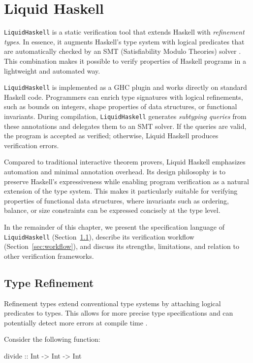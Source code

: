 \chapter { Liquid Haskell }
\texttt{LiquidHaskell} is a static verification tool that extends Haskell with
\emph{refinement types}. In essence, it augments Haskell’s type system with
logical predicates that are automatically checked by an SMT (Satisfiability
Modulo Theories) solver \cite{vazou2014}. This combination makes it possible
to verify properties of Haskell programs in a lightweight and automated way.

\texttt{LiquidHaskell} is implemented as a GHC plugin and works directly on standard
Haskell code. Programmers can enrich type signatures with logical refinements,
such as bounds on integers, shape properties of data structures, or functional
invariants. During compilation, \texttt{LiquidHaskell} generates \emph{subtyping
	queries} from these annotations and delegates them to an SMT solver. If the
queries are valid, the program is accepted as verified; otherwise, Liquid
Haskell produces verification errors.

Compared to traditional interactive theorem provers, Liquid Haskell emphasizes
automation and minimal annotation overhead. Its design philosophy is to
preserve Haskell’s expressiveness while enabling program verification as a
natural extension of the type system. This makes it particularly suitable for
verifying properties of functional data structures, where invariants such as
ordering, balance, or size constraints can be expressed concisely at the type
level.

In the remainder of this chapter, we present the specification language of
\texttt{LiquidHaskell} (Section~\ref{sec:specification}), describe its verification
workflow (Section~\ref{sec:workflow}), and discuss its strengths, limitations,
and relation to other verification frameworks.

\section {Type Refinement}
\label{sec:specification}

Refinement types extend conventional type systems by attaching logical predicates to types.
This allows for more precise type specifications and can potentially detect more errors
at compile time \cite{vazou2014}.

Consider the following function:

\begin{code}
	divide :: Int -> Int -> Int
\end{code}

